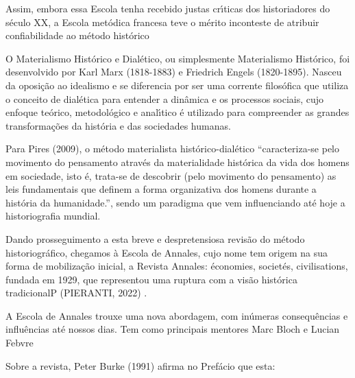 \documentclass[
12pt,		%
openright,	%
twoside,  %
a4paper,			%
chapter=TITLE,		%
english,			%
french,				%
spanish,			%
brazil				%
]{USPSC-classe/USPSC_RedarTex}
\begin{document}
Assim, embora essa Escola tenha recebido justas cr\'{\i}ticas dos historiadores do s\'eculo XX, a Escola met\'odica francesa teve o m\'erito inconteste de atribuir confiabilidade ao m\'etodo hist\'orico








O Materialismo Hist\'orico e Dial\'etico, ou simplesmente Materialismo Hist\'orico, foi desenvolvido  por Karl Marx (1818-1883) e Friedrich Engels (1820-1895). Nasceu da oposi\c{c}\~ao ao idealismo e se diferencia por ser uma corrente filos\'ofica que utiliza o conceito de dial\'etica para entender a din\^amica e os processos sociais, cujo enfoque te\'orico, metodol\'ogico e anal\'{\i}tico \'e utilizado para compreender as grandes transforma\c{c}\~oes da hist\'oria e das sociedades humanas.








Para  Pires (2009), o m\'etodo materialista hist\'orico-dial\'etico “caracteriza-se pelo movimento do pensamento atrav\'es da materialidade hist\'orica da vida dos homens em sociedade, isto \'e, trata-se de descobrir (pelo movimento do pensamento) as leis fundamentais que definem a forma organizativa dos homens durante a hist\'oria da humanidade.”, sendo um paradigma que vem influenciando at\'e hoje a historiografia mundial.








Dando prosseguimento a esta breve e despretensiosa revis\~ao do m\'etodo historiogr\'afico, chegamos \`a Escola de Annales, cujo nome tem origem na sua forma de mobiliza\c{c}\~ao inicial, a Revista Annales: \'economies, societ\'es, civilisations, fundada em 1929, que representou uma ruptura com a vis\~ao hist\'orica tradicionalP (PIERANTI, 2022) .








A Escola de Annales trouxe uma nova abordagem, com in\'umeras consequ\^encias e influ\^encias at\'e nossos dias. Tem como principais mentores  Marc Bloch e Lucian Febvre








Sobre a revista, Peter Burke (1991) afirma no Pref\'acio que esta:
\end{document}

